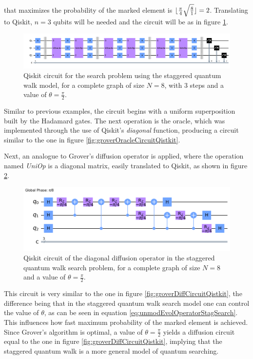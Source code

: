 \documentclass[../../dissertation.tex]{subfiles}
\begin{document}
that maximizes the probability of the marked element is
$\lfloor\frac{\pi}{4}\sqrt{\frac{8}{1}}\rfloor = 2$. Translating to Qiskit, $n=3$
qubits will be needed and the circuit will be as in figure \ref{fig:stagSearchCircQistkit}. 
\begin{figure}[!h]
	\centering
	\includegraphics[scale=0.35]{img/Qiskit/StaggeredQW/Search/Circuits/StagSearchCircuit_N3_M0_S3.png}
	\caption{Qiskit circuit for the search problem using the staggered quantum walk model, for a complete graph of size $N=8$, with $3$ steps and a value of $\theta = \frac{\pi}{2}$.}
	\label{fig:stagSearchCircQistkit}
\end{figure}
Similar to previous examples, the circuit begins with a uniform superposition
built by the Hadamard gates. The next operation is
the oracle, which was implemented through the use of Qiskit's \textit{diagonal}
function, producing a circuit similar to the one in figure
\ref{fig:groverOracleCircuitQistkit}.\par

Next, an analogue to Grover's diffusion operator is applied, where the
operation named \textit{UniOp} is a diagonal matrix, easily translated to
Qiskit, as shown in figure \ref{fig:stagSearchUniOpCircQistkit}.  
\begin{figure}[!h]
	\centering
	\includegraphics[scale=0.40]{img/Qiskit/StaggeredQW/Search/Circuits/StagUniOpCircuit_N3_M0_S3.png}
	\caption{Qiskit circuit of the  diagonal diffusion operator in the staggered quantum walk search problem, for a complete graph of size $N=8$ and a value of $\theta = \frac{\pi}{2}$.}
	\label{fig:stagSearchUniOpCircQistkit}
\end{figure}
This circuit is very similar to the one in figure
\ref{fig:groverDiffCircuitQistkit}, the difference being that in the staggered
quantum walk search model one can control the value of $\theta$, as can be seen
in equation \eqref{eq:unmodEvolOperatorStagSearch}. This influences how fast
maximum probability of the marked element is achieved. Since Grover's
algorithm is optimal, a value of $\theta=\frac{\pi}{2}$ yields a diffusion
circuit equal to the one in figure \ref{fig:groverDiffCircuitQistkit}, implying
that the staggered quantum walk is a more general model of quantum searching.\par
\end{document}
